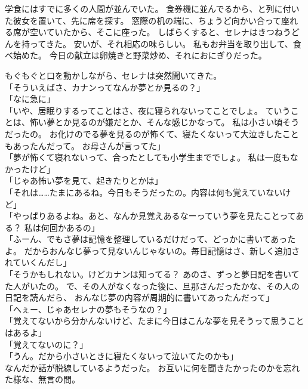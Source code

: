 \documentclass[../IHMain]{subfiles}
\begin{document}
学食にはすでに多くの人間が並んでいた。
食券機に並んでるから、と列に付いた彼女を置いて、先に席を探す。
窓際の机の端に、ちょうど向かい合って座れる席が空いていたから、そこに座った。
しばらくすると、セレナはきつねうどんを持ってきた。
安いが、それ相応の味らしい。
私もお弁当を取り出して、食べ始めた。
今日の献立は卵焼きと野菜炒め、それにおにぎりだった。

もぐもぐと口を動かしながら、セレナは突然聞いてきた。\\
「そういえばさ、カナンってなんか夢とか見るの？」\\
「なに急に」\\
「いや、居眠りするってことはさ、夜に寝られないってことでしょ。
ていうことは、怖い夢とか見るのが嫌だとか、そんな感じかなって。
私は小さい頃そうだったの。
お化けのでる夢を見るのが怖くて、寝たくないって大泣きしたこともあったんだって。
お母さんが言ってた」\\
「夢が怖くて寝れないって、合ったとしても小学生まででしょ。
私は一度もなかったけど」\\
「じゃあ怖い夢を見て、起きたりとかは」\\
「それは……たまにあるね。今日もそうだったの。内容は何も覚えていないけど」\\
「やっぱりあるよね。あと、なんか見覚えあるなーっていう夢を見たことってある？
私は何回かあるの」\\
「ふーん、でもさ夢は記憶を整理しているだけだって、どっかに書いてあったよ。
だからおんなじ夢って見ないんじゃないの。毎日記憶はさ、新しく追加されていくんだし」\\
「そうかもしれない。けどカナンは知ってる？
あのさ、ずっと夢日記を書いてた人がいたの。
で、その人がなくなった後に、旦那さんだったかな、その人の日記を読んだら、
おんなじ夢の内容が周期的に書いてあったんだって」\\
「へぇー、じゃあセレナの夢もそうなの？」\\
「覚えてないから分かんないけど、たまに今日はこんな夢を見そうって思うことはあるよ」\\
「覚えてないのに？」\\
「うん。だから小さいときに寝たくないって泣いてたのかも」\\
なんだか話が脱線しているようだった。
お互いに何を聞きたかったのかを忘れた様な、無言の間。
\end{document}
